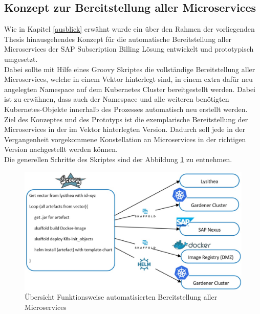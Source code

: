 \newpage

\subsection{Konzept zur Bereitstellung aller Microservices}
\label{anhang_umsetzung_komplettes_Deployment}
Wie in Kapitel \ref{ausblick} erwähnt wurde ein über den Rahmen der vorliegenden Thesis hinausgehendes Konzept für die automatische Bereitstellung aller Microservices der SAP Subscription Billing Lösung entwickelt und prototypisch umgesetzt.\\
Dabei sollte mit Hilfe eines Groovy Skriptes die vollständige Bereitstellung aller Microservices, welche in einem Vektor hinterlegt sind, in einem extra dafür neu angelegten Namespace auf dem Kubernetes Cluster bereitgestellt werden. Dabei ist zu erwähnen, dass auch der Namespace und alle weiteren benötigten Kubernetes-Objekte innerhalb des Prozesses automatisch neu erstellt werden.\\
Ziel des Konzeptes und des Prototyps ist die exemplarische Bereitstellung der Microservices in der im Vektor hinterlegten Version. Dadurch soll jede in der Vergangenheit vorgekommene Konstellation an Microservices in der richtigen Version nachgestellt werden können.\\
Die generellen Schritte des Skriptes sind der Abbildung \ref{anhang_k8s_vector_deployments} zu entnehmen.
\begin{figure}[h]
	\begin{center}
		\includegraphics[width=16cm]{img/k8s_vector_deployment.JPG}
		\caption[Übersicht Funktionsweise automatisierten Bereitstellung aller Microservices]{Übersicht Funktionsweise automatisierten Bereitstellung aller Microservices}
		\label{anhang_k8s_vector_deployments}
	\end{center}
\end{figure}

